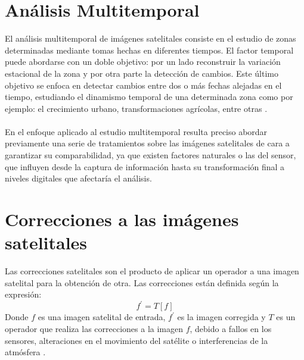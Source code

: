 \section{An\'alisis Multitemporal}
El an\'alisis multitemporal de im\'agenes satelitales consiste en el estudio de zonas determinadas mediante tomas hechas en diferentes tiempos. El factor temporal puede abordarse con un doble objetivo: por un lado reconstruir la variaci\'on estacional de la zona y por otra parte la detecci\'on de cambios. Este \'ultimo objetivo se enfoca en detectar cambios entre dos o m\'as
fechas alejadas en el tiempo, estudiando el dinamismo temporal de una determinada zona como por ejemplo: el crecimiento urbano, transformaciones agrícolas, entre otras \cite{salinero2002teledeteccion}.\\~\\
En el enfoque aplicado al estudio multitemporal resulta preciso abordar previamente una serie de tratamientos sobre las im\'agenes satelitales de cara a garantizar su comparabilidad, ya que existen factores naturales o las del sensor, que influyen desde la captura de informaci\'on hasta su transformaci\'on final a niveles digitales que afectar\'ia el an\'alisis.

\section{Correcciones a las im\'agenes satelitales}\label{sec:correcionesImages}
Las correcciones satelitales son el producto de aplicar un operador a una imagen satelital para la obtenci\'on de otra. Las correcciones est\'an definida seg\'un la expresi\'on:
		\begin{equation}
			f^{'}=T[f]
		\end{equation} 
Donde $ f $ es una imagen satelital de entrada, $ f^{'} $ es la imagen corregida y $ T $ es un operador que realiza las correcciones a la imagen $ f $, debido a fallos en los sensores, alteraciones en el movimiento del sat\'elite o interferencias de la atm\'osfera \cite{teledUm}.
